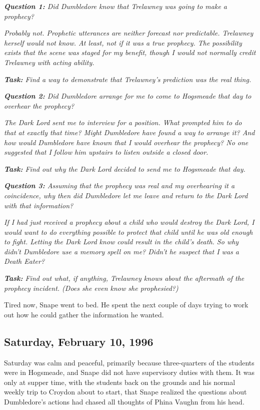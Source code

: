 
\emph{\textbf{Question 1:} Did Dumbledore know that Trelawney was going to make a prophecy?}

\emph{Probably not. Prophetic utterances are neither forecast nor predictable. Trelawney herself would not know. At least, not if it was a true prophecy. The possibility exists that the scene was staged for my benefit, though I would not normally credit Trelawney with acting ability.}

\emph{\textbf{Task:} Find a way to demonstrate that Trelawney's prediction was the real thing.}

\emph{\textbf{Question 2:} Did Dumbledore arrange for me to come to Hogsmeade that day to overhear the prophecy?}

\emph{The Dark Lord sent me to interview for a position. What prompted him to do that at exactly that time? Might Dumbledore have found a way to arrange it? And how would Dumbledore have known that I would overhear the prophecy? No one suggested that I follow him upstairs to listen outside a closed door.}

\emph{\textbf{Task:} Find out why the Dark Lord decided to send me to Hogsmeade that day.}

\emph{\textbf{Question 3:} Assuming that the prophecy was real and my overhearing it a coincidence, why then did Dumbledore let me leave and return to the Dark Lord with that information?}

\emph{If I had just received a prophecy about a child who would destroy the Dark Lord, I would want to do everything possible to protect that child until he was old enough to fight. Letting the Dark Lord know could result in the child's death. So why didn't Dumbledore use a memory spell on me? Didn't he suspect that I was a Death Eater?}

\emph{\textbf{Task:} Find out what, if anything, Trelawney knows about the aftermath of the prophecy incident. (Does she even know she prophesied?)}

Tired now, Snape went to bed. He spent the next couple of days trying to work out how he could gather the information he wanted.

\subsection{Saturday, February 10, 1996} %

Saturday was calm and peaceful, primarily because three-quarters of the students were in Hogsmeade, and Snape did not have supervisory duties with them. It was only at supper time, with the students back on the grounds and his normal weekly trip to Croydon about to start, that Snape realized the questions about Dumbledore's actions had chased all thoughts of Phina Vaughn from his head.


